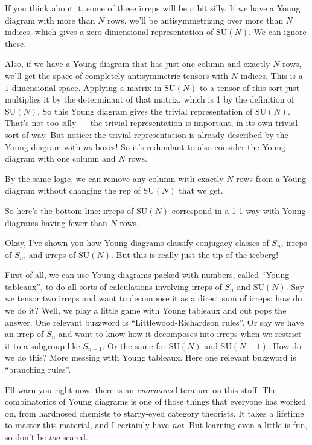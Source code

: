 \documentclass{article}
\begin{document}
If you think about it, some of these irreps will be a bit silly. If we
have a Young diagram with more than \(N\) rows, we'll be
antisymmetrizing over more than \(N\) indices, which gives a
zero-dimensional representation of \(\mathrm{SU}(N)\). We can ignore
these.

Also, if we have a Young diagram that has just one column and exactly
\(N\) rows, we'll get the space of completely antisymmetric tensors with
\(N\) indices. This is a \(1\)-dimensional space. Applying a matrix in
\(\mathrm{SU}(N)\) to a tensor of this sort just multiplies it by the
determinant of that matrix, which is 1 by the definition of
\(\mathrm{SU}(N)\). So this Young diagram gives the trivial
representation of \(\mathrm{SU}(N)\). That's not too silly --- the
trivial representation is important, in its own trivial sort of way. But
notice: the trivial representation is already described by the Young
diagram with \emph{no} boxes! So it's redundant to also consider the
Young diagram with one column and \(N\) rows.

By the same logic, we can remove any column with exactly \(N\) rows from
a Young diagram without changing the rep of \(\mathrm{SU}(N)\) that we
get.

So here's the bottom line: irreps of \(\mathrm{SU}(N)\) correspond in a
1-1 way with Young diagrams having fewer than \(N\) rows.

Okay, I've shown you how Young diagrams classify conjugacy classes of
\(S_n\), irreps of \(S_n\), and irreps of \(\mathrm{SU}(N)\). But this
is really just the tip of the iceberg!

First of all, we can use Young diagrams packed with numbers, called
``Young tableaux'', to do all sorts of calculations involving irreps of
\(S_n\) and \(\mathrm{SU}(N)\). Say we tensor two irreps and want to
decompose it as a direct sum of irreps: how do we do it? Well, we play a
little game with Young tableaux and out pops the answer. One relevant
buzzword is ``Littlewood-Richardson rules''. Or say we have an irrep of
\(S_n\) and want to know how it decomposes into irreps when we restrict
it to a subgroup like \(S_{n-1}\). Or the same for \(\mathrm{SU}(N)\)
and \(\mathrm{SU}(N-1)\). How do we do this? More messing with Young
tableaux. Here one relevant buzzword is ``branching rules''.

I'll warn you right now: there is an \emph{enormous} literature on this
stuff. The combinatorics of Young diagrams is one of those things that
everyone has worked on, from hardnosed chemists to starry-eyed category
theorists. It takes a lifetime to master this material, and I certainly
have \emph{not}. But learning even a little is fun, so don't be
\emph{too} scared.
\end{document}
